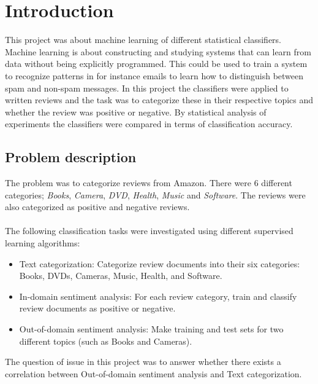 \chapter{Introduction}
This project was about machine learning of different statistical classifiers. Machine learning is about constructing and studying systems that can learn from data without being explicitly programmed. This could be used to train a system to recognize patterns in for instance emails to learn how to distinguish between spam and non-spam messages. In this project the classifiers were applied to written reviews and the task was to categorize these in their respective topics and whether the review was positive or negative. By statistical analysis of experiments the classifiers were compared in terms of classification accuracy.
\section{Problem description}
The problem was to categorize reviews from Amazon. There were 6 different categories;
\textit{Books}, \textit{Camera}, \textit{DVD}, \textit{Health}, \textit{Music} and \textit{Software}. The reviews were also
categorized as positive and negative reviews. 
\\\\
The following classification tasks were investigated using different supervised learning algorithms:
\begin{itemize}
\item Text categorization: Categorize review documents into their six categories: Books, DVDs, Cameras, Music, Health, and Software.
\item In-domain sentiment analysis: For each review category, train and classify review documents as positive or negative. 
\item  Out-of-domain sentiment analysis: Make training and test sets for two different topics (such as Books and Cameras).
\end{itemize}
The question of issue in this project was to answer whether there exists a correlation between Out-of-domain sentiment analysis and Text categorization. 
\\\\
